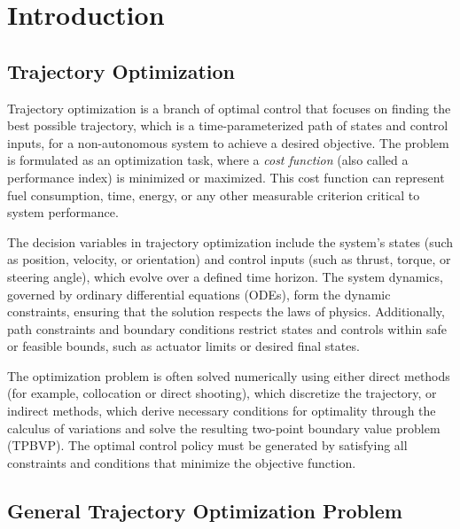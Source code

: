 
\chapter{Introduction}  %

\ifpdf
    \graphicspath{{Chapter1/Figs/Raster/}{Chapter1/Figs/PDF/}{Chapter1/Figs/}}
\else
    \graphicspath{{Chapter1/Figs/Vector/}{Chapter1/Figs/}}
\fi


\section{Trajectory Optimization}
Trajectory optimization is a branch of optimal control that focuses on finding the best possible trajectory, which is a time-parameterized path of states and control inputs, for a non-autonomous system to achieve a desired objective. The problem is formulated as an optimization task, where a \textit{cost function} (also called a performance index) is minimized or maximized. This cost function can represent fuel consumption, time, energy, or any other measurable criterion critical to system performance.

The decision variables in trajectory optimization include the system's states (such as position, velocity, or orientation) and control inputs (such as thrust, torque, or steering angle), which evolve over a defined time horizon. The system dynamics, governed by ordinary differential equations (ODEs), form the dynamic constraints, ensuring that the solution respects the laws of physics. Additionally, path constraints and boundary conditions restrict states and controls within safe or feasible bounds, such as actuator limits or desired final states.

The optimization problem is often solved numerically using either direct methods (for example, collocation or direct shooting), which discretize the trajectory, or indirect methods, which derive necessary conditions for optimality through the calculus of variations and solve the resulting two-point boundary value problem (TPBVP). The optimal control policy must be generated by satisfying all constraints and conditions that minimize the objective function.


\section{General Trajectory Optimization Problem}

